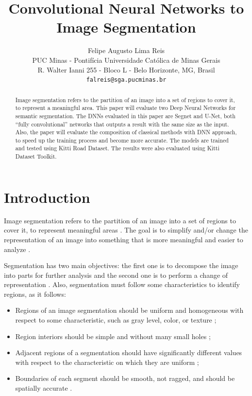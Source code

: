 \documentclass[10pt,twocolumn,letterpaper]{article}
\begin{document}
\title{Convolutional Neural Networks to Image Segmentation}

\author{Felipe Augusto Lima Reis\\
PUC Minas - Pontif\'icia Universidade Cat\'olica de Minas Gerais\\
R. Walter Ianni 255 - Bloco L - Belo Horizonte, MG, Brasil\\
{\tt\small falreis@sga.pucminas.br}
}

\maketitle

\begin{abstract}
    Image segmentation refers to the partition of an image into a set of regions to cover it, to represent a meaningful area. This paper will evaluate two Deep Neural Networks for semantic segmentation. The DNNs evaluated in this paper are Segnet and U-Net, both ``fully convolutional'' networks that outputs a result with the same size as the input. Also, the paper will evaluate the composition of classical methods with DNN approach, to speed up the training process and become more accurate. The models are trained and tested using Kitti Road Dataset. The results were also evaluated using Kitti Dataset Toolkit. 
\end{abstract}

\section{Introduction} \label{introduction}

Image segmentation refers to the partition of an image into a set of regions to cover it, to represent meaningful areas \cite{DOMINGUEZ}. The goal is to simplify and/or change the representation of an image into something that is more meaningful and easier to analyze \cite{AHMED_SARMA}.

Segmentation has two main objectives: the first one is to decompose the image into parts for further analysis and the second one is to perform a change of representation \cite{DOMINGUEZ}. Also, segmentation must follow some characteristics to identify regions, as it follows:

\begin{itemize}
 \item Regions of an image segmentation should be uniform and homogeneous with respect to some characteristic, such as gray level, color, or texture \cite{DOMINGUEZ};
 \item Region interiors should be simple and without many small holes \cite{DOMINGUEZ};
 \item Adjacent regions of a segmentation should have significantly different values with respect to the characteristic on which they are uniform \cite{DOMINGUEZ};
 \item Boundaries of each segment should be smooth, not ragged, and should be spatially accurate \cite{DOMINGUEZ}.
\end{itemize}
\end{document}
